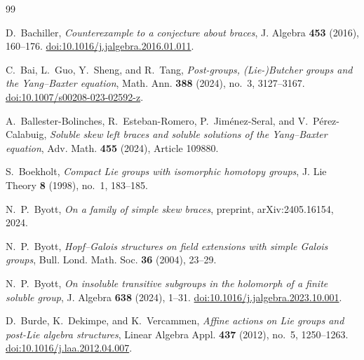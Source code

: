 \documentclass[reqno]{amsart}
\begin{document}














\begin{thebibliography}{99}

D.~Bachiller,
\emph{Counterexample to a conjecture about braces},
J. Algebra \textbf{453} (2016), 160--176.
\href{https://doi.org/10.1016/j.jalgebra.2016.01.011}{doi:10.1016/j.jalgebra.2016.01.011}.

C.~Bai, L.~Guo, Y.~Sheng, and R.~Tang,
\emph{Post-groups, (Lie-)Butcher groups and the Yang--Baxter equation},
Math. Ann. \textbf{388} (2024), no.~3, 3127--3167.
\href{https://doi.org/10.1007/s00208-023-02592-z}{doi:10.1007/s00208-023-02592-z}.

A.~Ballester-Bolinches, R.~Esteban-Romero, P.~Jim\'enez-Seral, and V.~P\'erez-Calabuig,
\emph{Soluble skew left braces and soluble solutions of the Yang--Baxter equation},
Adv. Math. \textbf{455} (2024), Article 109880.

S.~Boekholt,
\emph{Compact Lie groups with isomorphic homotopy groups},
J. Lie Theory \textbf{8} (1998), no.~1, 183--185.


N.~P.~Byott,
\emph{On a family of simple skew braces},
preprint, arXiv:2405.16154, 2024.

N.~P.~Byott,
\emph{Hopf--Galois structures on field extensions with simple Galois groups},
Bull. Lond. Math. Soc. \textbf{36} (2004), 23--29.

N.~P.~Byott,
\emph{On insoluble transitive subgroups in the holomorph of a finite soluble group},
J. Algebra \textbf{638} (2024), 1--31.
\href{https://doi.org/10.1016/j.jalgebra.2023.10.001}{doi:10.1016/j.jalgebra.2023.10.001}.



D.~Burde, K.~Dekimpe, and K.~Vercammen,
\emph{Affine actions on Lie groups and post-Lie algebra structures},
Linear Algebra Appl. \textbf{437} (2012), no.~5, 1250--1263.
\href{https://doi.org/10.1016/j.laa.2012.04.007}{doi:10.1016/j.laa.2012.04.007}.


\end{thebibliography}
\end{document}
